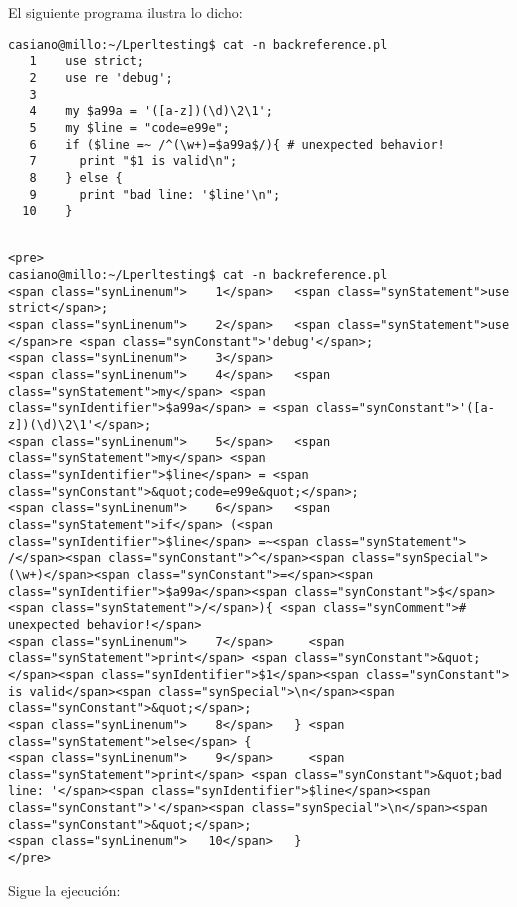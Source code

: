 El siguiente programa ilustra lo dicho:
\begin{latexonly}
\begin{verbatim}
casiano@millo:~/Lperltesting$ cat -n backreference.pl
   1    use strict;
   2    use re 'debug';
   3  
   4    my $a99a = '([a-z])(\d)\2\1';
   5    my $line = "code=e99e";
   6    if ($line =~ /^(\w+)=$a99a$/){ # unexpected behavior!
   7      print "$1 is valid\n";
   8    } else {
   9      print "bad line: '$line'\n";
  10    }
\end{verbatim}
\end{latexonly}
\begin{verbatim}

<pre>
casiano@millo:~/Lperltesting$ cat -n backreference.pl
<span class="synLinenum">    1</span>   <span class="synStatement">use strict</span>;
<span class="synLinenum">    2</span>   <span class="synStatement">use </span>re <span class="synConstant">'debug'</span>;
<span class="synLinenum">    3</span> 
<span class="synLinenum">    4</span>   <span class="synStatement">my</span> <span class="synIdentifier">$a99a</span> = <span class="synConstant">'([a-z])(\d)\2\1'</span>;
<span class="synLinenum">    5</span>   <span class="synStatement">my</span> <span class="synIdentifier">$line</span> = <span class="synConstant">&quot;code=e99e&quot;</span>;
<span class="synLinenum">    6</span>   <span class="synStatement">if</span> (<span class="synIdentifier">$line</span> =~<span class="synStatement"> /</span><span class="synConstant">^</span><span class="synSpecial">(\w+)</span><span class="synConstant">=</span><span class="synIdentifier">$a99a</span><span class="synConstant">$</span><span class="synStatement">/</span>){ <span class="synComment"># unexpected behavior!</span>
<span class="synLinenum">    7</span>     <span class="synStatement">print</span> <span class="synConstant">&quot;</span><span class="synIdentifier">$1</span><span class="synConstant"> is valid</span><span class="synSpecial">\n</span><span class="synConstant">&quot;</span>;
<span class="synLinenum">    8</span>   } <span class="synStatement">else</span> {
<span class="synLinenum">    9</span>     <span class="synStatement">print</span> <span class="synConstant">&quot;bad line: '</span><span class="synIdentifier">$line</span><span class="synConstant">'</span><span class="synSpecial">\n</span><span class="synConstant">&quot;</span>;
<span class="synLinenum">   10</span>   }
</pre>

\end{verbatim}
Sigue la ejecución:
